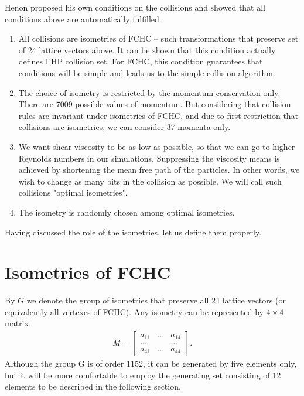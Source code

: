 Henon proposed his own conditions on the collisions and showed that all conditions above are automatically fulfilled.

\begin{enumerate}
\item All collisions are isometries of FCHC -- such transformations that preserve set of 24 lattice vectors above. It can be shown that this condition actually defines FHP collision set. For FCHC, this condition guarantees that conditions will be simple and leads us to the simple collision algorithm.

\item The choice of isometry is restricted by the momentum conservation only.
There are 7009 possible values of momentum. But considering that collision rules are invariant under isometries of FCHC, and due to first restriction that collisions are isometries, we can consider 37 momenta only.

\item We want shear viscosity to be as low as possible, so that we can go to higher Reynolds numbers in our simulations. Suppressing the viscosity means is achieved by shortening the mean free path of the particles. In other words, we wish to change as many bits in the collision as possible. We will call such collisions "optimal isometries".

\item The isometry is randomly chosen among optimal isometries.

\end{enumerate}

Having discussed the role of the isometries, let us define them properly.

\section{Isometries of FCHC} 

By $G$ we denote the group of isometries that preserve all 24 lattice vectors (or equivalently all vertexes of FCHC). Any isometry can be represented by $4 \times 4$ matrix
\begin{align}
M = 
\begin{bmatrix}
a_{11} & ... & a_{14} \\
... & & ... \\
a_{41} & ... & a_{44}
\end{bmatrix}.
\end{align}
Although the group G is of order 1152, it can be generated by five elements only,
but it will be more comfortable to employ the generating set consisting of 12 elements to be described in the following section.

